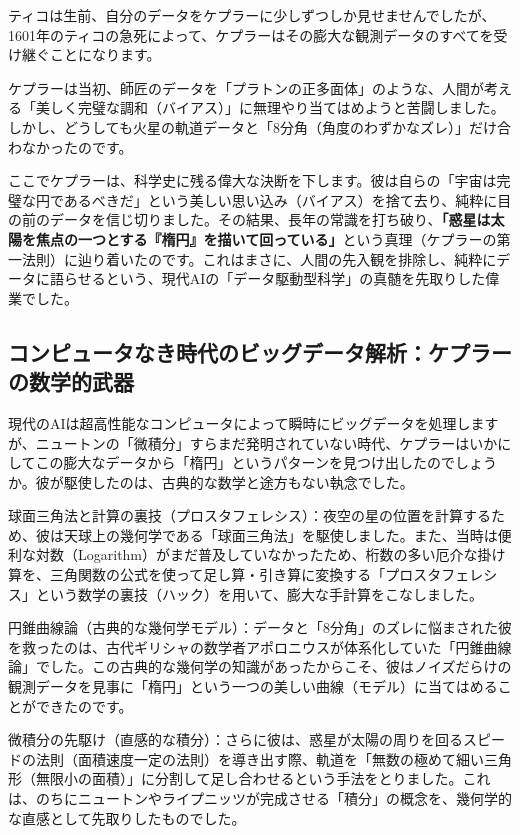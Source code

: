 ティコは生前、自分のデータをケプラーに少しずつしか見せませんでしたが、1601年のティコの急死によって、ケプラーはその膨大な観測データのすべてを受け継ぐことになります。

ケプラーは当初、師匠のデータを「プラトンの正多面体」のような、人間が考える「美しく完璧な調和（バイアス）」に無理やり当てはめようと苦闘しました。しかし、どうしても火星の軌道データと「8分角（角度のわずかなズレ）」だけ合わなかったのです。

ここでケプラーは、科学史に残る偉大な決断を下します。彼は自らの「宇宙は完璧な円であるべきだ」という美しい思い込み（バイアス）を捨て去り、純粋に目の前のデータを信じ切りました。その結果、長年の常識を打ち破り、\textbf{「惑星は太陽を焦点の一つとする『楕円』を描いて回っている」}という真理（ケプラーの第一法則）に辿り着いたのです。これはまさに、人間の先入観を排除し、純粋にデータに語らせるという、現代AIの「データ駆動型科学」の真髄を先取りした偉業でした。

\subsection{コンピュータなき時代のビッグデータ解析：ケプラーの数学的武器}

現代のAIは超高性能なコンピュータによって瞬時にビッグデータを処理しますが、ニュートンの「微積分」すらまだ発明されていない時代、ケプラーはいかにしてこの膨大なデータから「楕円」というパターンを見つけ出したのでしょうか。彼が駆使したのは、古典的な数学と途方もない執念でした。

球面三角法と計算の裏技（プロスタフェレシス）：夜空の星の位置を計算するため、彼は天球上の幾何学である「球面三角法」を駆使しました。また、当時は便利な対数（Logarithm）がまだ普及していなかったため、桁数の多い厄介な掛け算を、三角関数の公式を使って足し算・引き算に変換する「プロスタフェレシス」という数学の裏技（ハック）を用いて、膨大な手計算をこなしました。

円錐曲線論（古典的な幾何学モデル）：データと「8分角」のズレに悩まされた彼を救ったのは、古代ギリシャの数学者アポロニウスが体系化していた「円錐曲線論」でした。この古典的な幾何学の知識があったからこそ、彼はノイズだらけの観測データを見事に「楕円」という一つの美しい曲線（モデル）に当てはめることができたのです。

微積分の先駆け（直感的な積分）：さらに彼は、惑星が太陽の周りを回るスピードの法則（面積速度一定の法則）を導き出す際、軌道を「無数の極めて細い三角形（無限小の面積）」に分割して足し合わせるという手法をとりました。これは、のちにニュートンやライプニッツが完成させる「積分」の概念を、幾何学的な直感として先取りしたものでした。

